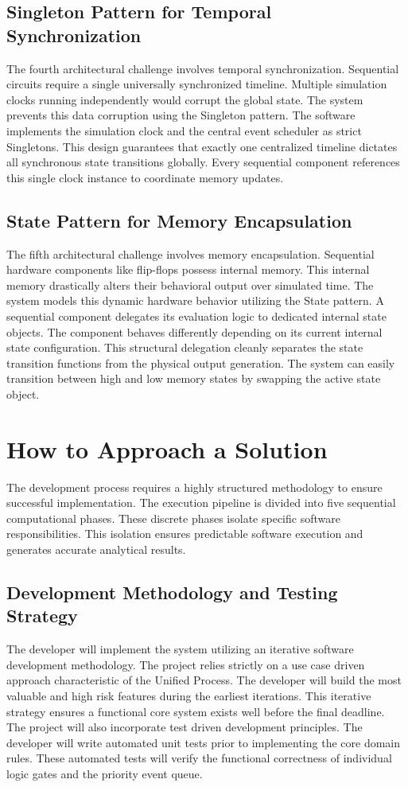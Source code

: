 \documentclass[12pt, a4paper]{article}
\begin{document}
\subsection{Singleton Pattern for Temporal Synchronization}
The fourth architectural challenge involves temporal synchronization. Sequential circuits require a single universally synchronized timeline. Multiple simulation clocks running independently would corrupt the global state. The system prevents this data corruption using the Singleton pattern. The software implements the simulation clock and the central event scheduler as strict Singletons. This design guarantees that exactly one centralized timeline dictates all synchronous state transitions globally. Every sequential component references this single clock instance to coordinate memory updates.

\subsection{State Pattern for Memory Encapsulation}
The fifth architectural challenge involves memory encapsulation. Sequential hardware components like flip-flops possess internal memory. This internal memory drastically alters their behavioral output over simulated time. The system models this dynamic hardware behavior utilizing the State pattern. A sequential component delegates its evaluation logic to dedicated internal state objects. The component behaves differently depending on its current internal state configuration. This structural delegation cleanly separates the state transition functions from the physical output generation. The system can easily transition between high and low memory states by swapping the active state object.

\section{How to Approach a Solution}
The development process requires a highly structured methodology to ensure successful implementation. The execution pipeline is divided into five sequential computational phases. These discrete phases isolate specific software responsibilities. This isolation ensures predictable software execution and generates accurate analytical results.

\subsection{Development Methodology and Testing Strategy}
The developer will implement the system utilizing an iterative software development methodology. The project relies strictly on a use case driven approach characteristic of the Unified Process. The developer will build the most valuable and high risk features during the earliest iterations. This iterative strategy ensures a functional core system exists well before the final deadline. The project will also incorporate test driven development principles. The developer will write automated unit tests prior to implementing the core domain rules. These automated tests will verify the functional correctness of individual logic gates and the priority event queue.
\end{document}
